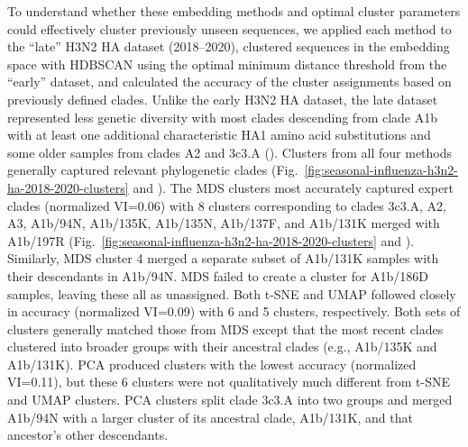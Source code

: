 \documentclass[10pt,letterpaper]{article}
\begin{document}
To understand whether these embedding methods and optimal cluster parameters could effectively cluster previously unseen sequences, we applied each method to the ``late'' H3N2 HA dataset (2018--2020), clustered sequences in the embedding space with HDBSCAN using the optimal minimum distance threshold from the ``early'' dataset, and calculated the accuracy of the cluster assignments based on previously defined clades.
Unlike the early H3N2 HA dataset, the late dataset represented less genetic diversity with most clades descending from clade A1b with at least one additional characteristic HA1 amino acid substitutions  and some older samples from clades A2 and 3c3.A ().
Clusters from all four methods generally captured relevant phylogenetic clades (Fig.~\ref{fig:seasonal-influenza-h3n2-ha-2018-2020-clusters} and ).
The MDS clusters most accurately captured expert clades (normalized VI=0.06) with 8 clusters corresponding to clades 3c3.A, A2, A3, A1b/94N, A1b/135K, A1b/135N, A1b/137F, and A1b/131K merged with A1b/197R (Fig.~\ref{fig:seasonal-influenza-h3n2-ha-2018-2020-clusters} and ).
Similarly, MDS cluster 4 merged a separate subset of A1b/131K samples with their descendants in A1b/94N.
MDS failed to create a cluster for A1b/186D samples, leaving these all as unassigned.
Both t-SNE and UMAP followed closely in accuracy (normalized VI=0.09) with 6 and 5 clusters, respectively.
Both sets of clusters generally matched those from MDS except that the most recent clades clustered into broader groups with their ancestral clades (e.g., A1b/135K and A1b/131K).
PCA produced clusters with the lowest accuracy (normalized VI=0.11), but these 6 clusters were not qualitatively much different from t-SNE and UMAP clusters.
PCA clusters split clade 3c3.A into two groups and merged A1b/94N with a larger cluster of its ancestral clade, A1b/131K, and that ancestor's other descendants.
\end{document}
